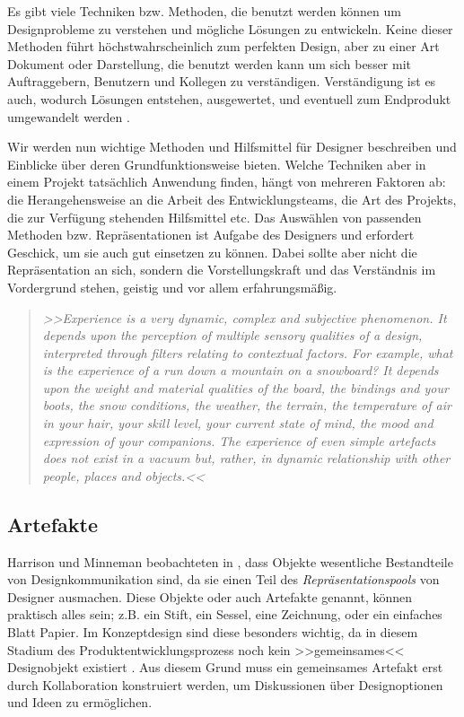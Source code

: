 \medskip Es gibt viele Techniken bzw. Methoden, die benutzt werden können um Designprobleme zu verstehen und mögliche Lösungen zu entwickeln. Keine dieser Methoden führt höchstwahrscheinlich zum perfekten Design, aber zu einer Art Dokument oder Darstellung, die benutzt werden kann um sich besser mit Auftraggebern, Benutzern und Kollegen zu verständigen. Verständigung ist es auch, wodurch Lösungen entstehen, ausgewertet, und eventuell zum Endprodukt umgewandelt werden \citep{Benyon:2005}.

\medskip Wir werden nun wichtige Methoden und Hilfsmittel für Designer beschreiben und Einblicke über deren Grundfunktionsweise bieten. Welche Techniken aber in einem Projekt tatsächlich Anwendung finden, hängt von mehreren Faktoren ab: die Herangehensweise an die Arbeit des Entwicklungsteams, die Art des Projekts, die zur Verfügung stehenden Hilfsmittel etc. Das Auswählen von passenden Methoden bzw. Repräsentationen ist Aufgabe des Designers und erfordert Geschick, um sie auch gut einsetzen zu können. Dabei sollte aber nicht die Repräsentation an sich, sondern die Vorstellungskraft und das Verständnis im Vordergrund stehen, geistig und vor allem erfahrungsmäßig. \citep{Sagmeister:2008} 

\begin{quote}
	\textsl{>>Experience is a very dynamic, complex and subjective phenomenon. It depends upon the perception of multiple sensory qualities of a design, interpreted through filters relating to contextual factors. For example, what is the experience of a run down a mountain on a snowboard? It depends upon the weight and material qualities of the board, the bindings and your boots, the snow conditions, the weather, the terrain, the temperature of air in your hair, your skill level, your current state of mind, the mood and expression of your companions. The experience of even simple artefacts does not exist in a vacuum but, rather, in dynamic relationship with other people, places and objects.<<}
\begin{flushright}\citep{Buxton:2007}\end{flushright}
\end{quote}

\subsection{Artefakte}
Harrison und Minneman beobachteten in \citep{Harrison:1996}, dass Objekte wesentliche Bestandteile von Designkommunikation sind, da sie einen Teil des \emph{Repräsentationspools} von Designer ausmachen. Diese Objekte oder auch Artefakte genannt, können praktisch alles sein; z.B. ein Stift, ein Sessel, eine Zeichnung, oder ein einfaches Blatt Papier. Im Konzeptdesign sind diese besonders wichtig, da in diesem Stadium des Produktentwicklungsprozess noch kein >>gemeinsames<< Designobjekt existiert \citep{Tuikka:2001}. Aus diesem Grund muss ein gemeinsames Artefakt erst durch Kollaboration konstruiert werden, um Diskussionen über Designoptionen und Ideen zu ermöglichen. \citep{Larsson:2003}

